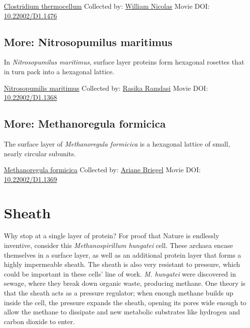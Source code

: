\documentclass[]{tufte-book}
\begin{document}
\hypertarget{htmlwidget-4c5ecff5ef7afba5fcbc}{}

\label{fig:2-7b}\protect\hyperlink{tree}{Clostridium thermocellum} Collected by: \protect\hyperlink{william_nicolas}{William Nicolas} Movie DOI: \href{https://doi.org/10.22002/D1.1476}{10.22002/D1.1476}

\hypertarget{Nitrosopumilus_maritimus}{%
\subsection*{More: Nitrosopumilus maritimus}\label{Nitrosopumilus_maritimus}}

In \emph{Nitrosopumilus maritimus}, surface layer proteins form hexagonal rosettes that in turn pack into a hexagonal lattice.



\hypertarget{htmlwidget-9269e5575622e53d8136}{}

\label{fig:2-7c}\protect\hyperlink{tree}{Nitrosopumilis maritimus} Collected by: \protect\hyperlink{rasika_ramdasi}{Rasika Ramdasi} Movie DOI: \href{https://doi.org/10.22002/D1.1368}{10.22002/D1.1368}

\hypertarget{Methanoregula_formicica}{%
\subsection*{More: Methanoregula formicica}\label{Methanoregula_formicica}}

The surface layer of \emph{Methanoregula formicica} is a hexagonal lattice of small, nearly circular subunits.



\hypertarget{htmlwidget-5d7b66c5b050709cbba3}{}

\label{fig:2-7d}\protect\hyperlink{tree}{Methanoregula formicica} Collected by: \protect\hyperlink{ariane_briegel}{Ariane Briegel} Movie DOI: \href{https://doi.org/10.22002/D1.1369}{10.22002/D1.1369}

\hypertarget{sheath}{%
\section{Sheath}\label{sheath}}

Why stop at a single layer of protein? For proof that Nature is endlessly inventive, consider this \emph{Methanospirillum hungatei} cell. These archaea encase themselves in a surface layer, as well as an additional protein layer that forms a highly impermeable sheath. The sheath is also very resistant to pressure, which could be important in these cells' line of work. \emph{M. hungatei} were discovered in sewage, where they break down organic waste, producing methane. One theory is that the sheath acts as a pressure regulator; when enough methane builds up inside the cell, the pressure expands the sheath, opening its pores wide enough to allow the methane to dissipate and new metabolic substrates like hydrogen and carbon dioxide to enter.
\end{document}
